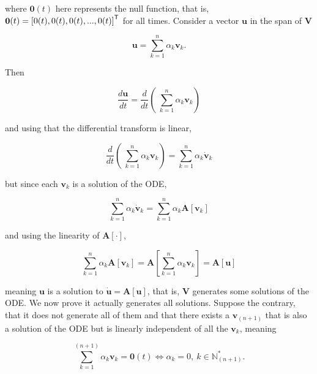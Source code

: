 	\noindent where $\mathbf{0}(t)$ here represents the null function, that is, $\mathbf{0}(t) = \left[0(t),0(t),0(t),...,0(t)\right]^{\mathsf{T}}$ for all times. Consider a vector $\mathbf{u}$ in the span of $\mathbf{V}$

\begin{equation} \mathbf{u} = \sum_{k=1}^n \alpha_k \mathbf{v}_k.\end{equation}

	Then

\begin{equation} \dfrac{d\mathbf{u}}{dt} = \dfrac{d}{dt}\left(\ \sum_{k=1}^n \alpha_k \mathbf{v}_k\right) \end{equation}

	\noindent and using that the differential transform is linear,

\begin{equation} \dfrac{d}{dt}\left(\ \sum_{k=1}^n \alpha_k \mathbf{v}_k\right) = \sum_{k=1}^n \alpha_k \dot{\mathbf{v}}_k \end{equation}

	\noindent but since each $\mathbf{v}_k$ is a solution of the ODE,

\begin{equation} \sum_{k=1}^n \alpha_k \dot{\mathbf{v}}_k = \sum_{k=1}^n \alpha_k \mathbf{A}\left[\mathbf{v}_k\right]   \end{equation}

	\noindent and using the linearity of $\mathbf{A}\left[\cdot\right]$,

\begin{equation} \sum_{k=1}^n \alpha_k \mathbf{A}\left[\mathbf{v}_k\right] = \mathbf{A}\left[\sum_{k=1}^n \alpha_k \mathbf{v}_k\right] = \mathbf{A}\left[\mathbf{u}\right] \end{equation}

	\noindent meaning $\mathbf{u}$ is a solution to $\dot{\mathbf{u}} = \mathbf{A}\left[\mathbf{u}\right]$, that is, $\mathbf{V}$ generates some solutions of the ODE. We now prove it actually generates all solutions. Suppose the contrary, that it does not generate all of them and that there exists a $\mathbf{v}_{(n+1)}$ that is also a solution of the ODE but is linearly independent of all the $\mathbf{v}_k$, meaning

\begin{equation} \sum_{k=1}^{(n+1)} \alpha_k \mathbf{v}_k = \mathbf{0}(t)\Leftrightarrow \alpha_k = 0,\ k\in\mathbb{N}_{(n+1)}^* .\end{equation}

